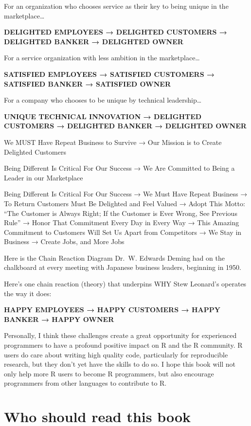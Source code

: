 \documentclass[
]{book}
\begin{document}
For an organization who chooses service as their key to being unique in the marketplace\ldots{}

\textbf{DELIGHTED EMPLOYEES {→} DELIGHTED CUSTOMERS {→} DELIGHTED BANKER {→} DELIGHTED OWNER}

For a service organization with less ambition in the marketplace\ldots{}

\textbf{SATISFIED EMPLOYEES {→} SATISFIED CUSTOMERS {→} SATISFIED BANKER {→} SATISFIED OWNER}

For a company who chooses to be unique by technical leadership\ldots{}

\textbf{UNIQUE TECHNICAL INNOVATION {→} DELIGHTED CUSTOMERS {→} DELIGHTED BANKER {→} DELIGHTED OWNER}

We MUST Have Repeat Business to Survive → Our Mission is to Create Delighted Customers

Being Different Is Critical For Our Success → We Are Committed to Being a Leader in our Marketplace

Being Different Is Critical For Our Success → We Must Have Repeat Business → To Return Customers Must Be Delighted and Feel Valued → Adopt This Motto: ``The Customer is Always Right; If the Customer is Ever Wrong, See Previous Rule'' → Honor That Commitment Every Day in Every Way → This Amazing Commitment to Customers Will Set Us Apart from Competitors → We Stay in Business → Create Jobs, and More Jobs

Here is the Chain Reaction Diagram Dr.~W. Edwards Deming had on the chalkboard at every meeting with Japanese business leaders, beginning in 1950.

Here's one chain reaction (theory) that underpins WHY Stew Leonard's operates the way it does:

\textbf{HAPPY EMPLOYEES {→} HAPPY CUSTOMERS {→} HAPPY BANKER {→} HAPPY OWNER}

Personally, I think these challenges create a great opportunity for experienced programmers to have a profound positive impact on R and the R community. R users do care about writing high quality code, particularly for reproducible research, but they don't yet have the skills to do so. I hope this book will not only help more R users to become R programmers, but also encourage programmers from other languages to contribute to R.

\hypertarget{who-should-read}{%
\section{Who should read this book}\label{who-should-read}}
\end{document}
